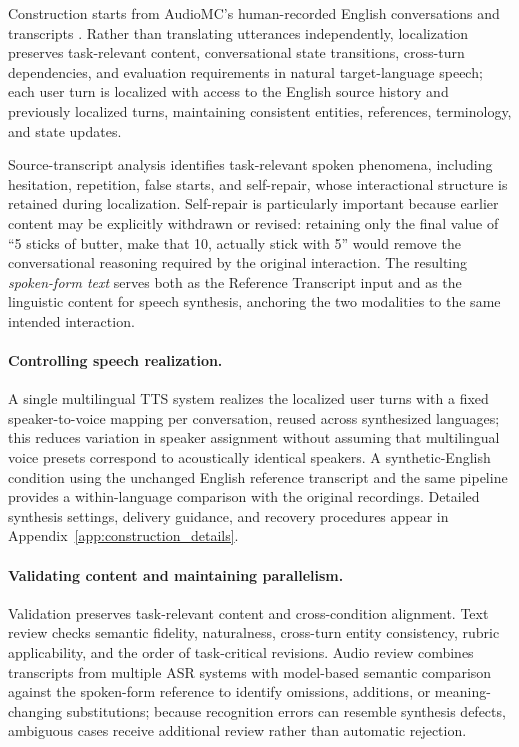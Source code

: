\documentclass{article}
\begin{document}
    Construction starts from AudioMC's human-recorded English conversations and transcripts \citep{gosai2026audiomultichallenge}. Rather than translating utterances independently, localization preserves task-relevant content, conversational state transitions, cross-turn dependencies, and evaluation requirements in natural target-language speech; each user turn is localized with access to the English source history and previously localized turns, maintaining consistent entities, references, terminology, and state updates.

    Source-transcript analysis identifies task-relevant spoken phenomena, including hesitation, repetition, false starts, and self-repair, whose interactional structure is retained during localization. Self-repair is particularly important because earlier content may be explicitly withdrawn or revised: retaining only the final value of ``5 sticks of butter, make that 10, actually stick with 5'' would remove the conversational reasoning required by the original interaction. The resulting \textit{spoken-form text} serves both as the Reference Transcript input and as the linguistic content for speech synthesis, anchoring the two modalities to the same intended interaction.

    \paragraph{Controlling speech realization.}
    \label{sec:speech_realization}

    A single multilingual TTS system realizes the localized user turns with a fixed speaker-to-voice mapping per conversation, reused across synthesized languages; this reduces variation in speaker assignment without assuming that multilingual voice presets correspond to acoustically identical speakers. A synthetic-English condition using the unchanged English reference transcript and the same pipeline provides a within-language comparison with the original recordings. Detailed synthesis settings, delivery guidance, and recovery procedures appear in Appendix~\ref{app:construction_details}.

    \paragraph{Validating content and maintaining parallelism.}
    \label{sec:quality_control}

    Validation preserves task-relevant content and cross-condition alignment. Text review checks semantic fidelity, naturalness, cross-turn entity consistency, rubric applicability, and the order of task-critical revisions. Audio review combines transcripts from multiple ASR systems with model-based semantic comparison against the spoken-form reference to identify omissions, additions, or meaning-changing substitutions; because recognition errors can resemble synthesis defects, ambiguous cases receive additional review rather than automatic rejection.
\end{document}
